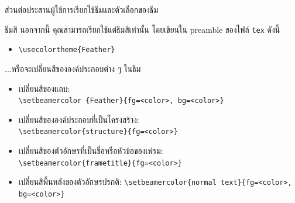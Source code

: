 \documentclass[10pt,xcolor={dvipsnames}]{beamer}
\begin{document}
\begin{frame}[shrink]{ส่วนต่อประสานผู้ใช้}{การเรียกใช้ธีมและตัวเลือกของธีม}

  \begin{block}{ธีมสี}
    นอกจากนี้ คุณสามารถเรียกใช้แต่ธีมสีเท่านั้น โดยเขียนใน preamble ของไฟล์ {\tt tex} ดังนี้ 
    
    \vspace{5pt} 
    
    \begin{itemize}
    \item {\tt \textbackslash usecolortheme\{Feather\}}
    \end{itemize}
    
    \vspace{5pt}
    
    ...หรือจะเปลี่ยนสีขององค์ประกอบต่าง ๆ ในธีม
    
    \vspace{5pt} 
    \begin{itemize}
    \item เปลี่ยนสีของแถบ: \\    
    {\tt \textbackslash setbeamercolor \{Feather\}\{fg=<color>, bg=<color>\}}
    
    \vspace{2pt} 
    
    \item เปลี่ยนสีขององค์ประกอบที่เป็นโครงสร้าง: \\    
    {\tt \textbackslash setbeamercolor\{structure\}\{fg=<color>\}}
    
    \vspace{2pt} 
    
    \item เปลี่ยนสีของตัวอักษรที่เป็นชื่อหรือหัวข้อของเฟรม:\\
    {\tt \textbackslash setbeamercolor\{frametitle\}\{fg=<color>\}}
    
    \vspace{2pt} 
    
    \item เปลี่ยนสีพี้นหลังของตัวอักษรปรกติ:    
    {\tt \textbackslash setbeamercolor\{normal text\}\{fg=<color>, bg=<color>\}}
    \end{itemize}
  \end{block}
\end{frame}


\end{document}
